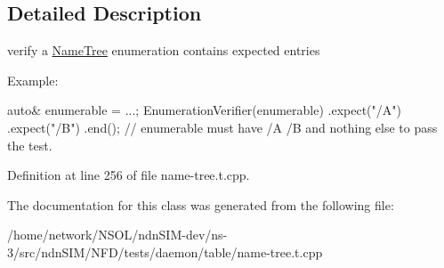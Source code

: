 \subsection{Detailed Description}
verify a \hyperlink{classnfd_1_1NameTree}{Name\+Tree} enumeration contains expected entries 

Example\+: 
\begin{DoxyCode}
\textcolor{keyword}{auto}& enumerable = ...;
EnumerationVerifier(enumerable)
  .expect(\textcolor{stringliteral}{"/A"})
  .expect(\textcolor{stringliteral}{"/B"})
  .end();
\textcolor{comment}{// enumerable must have /A /B and nothing else to pass the test.}
\end{DoxyCode}
 

Definition at line 256 of file name-\/tree.\+t.\+cpp.



The documentation for this class was generated from the following file\+:\begin{DoxyCompactItemize}
\item 
/home/network/\+N\+S\+O\+L/ndn\+S\+I\+M-\/dev/ns-\/3/src/ndn\+S\+I\+M/\+N\+F\+D/tests/daemon/table/name-\/tree.\+t.\+cpp\end{DoxyCompactItemize}
